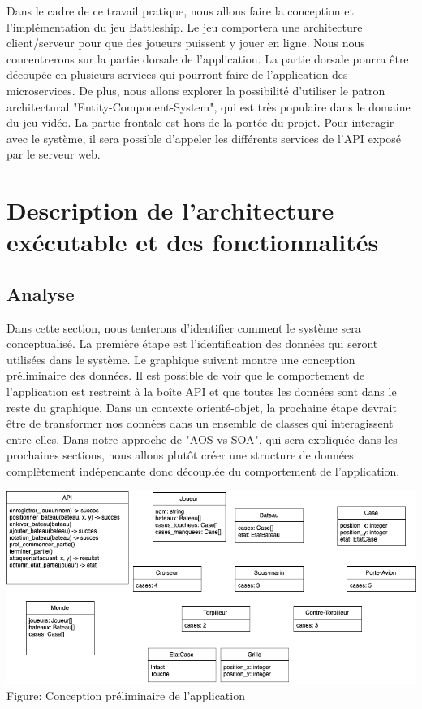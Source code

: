 \documentclass[12pt]{article}
\begin{document}
Dans le cadre de ce travail pratique, nous allons faire la conception et l'implémentation du jeu Battleship. Le jeu comportera une architecture client/serveur pour que des joueurs puissent y jouer en ligne. Nous nous concentrerons sur la partie dorsale de l'application. La partie dorsale pourra être découpée en plusieurs services qui pourront faire de l'application des microservices. De plus, nous allons explorer la possibilité d'utiliser le patron architectural "Entity-Component-System", qui est très populaire dans le domaine du jeu vidéo. La partie frontale est hors de la portée du projet. Pour interagir avec le système, il sera possible d'appeler les différents services de l'API exposé par le serveur web.

\section{Description de l’architecture exécutable et des fonctionnalités} 

\subsection{Analyse}
Dans cette section, nous tenterons d'identifier comment le système sera conceptualisé. La première étape est l'identification des données qui seront utilisées dans le système. Le graphique suivant montre une conception préliminaire des données. Il est possible de voir que le comportement de l'application est restreint à la boîte API et que toutes les données sont dans le reste du graphique. Dans un contexte orienté-objet, la prochaine étape devrait être de transformer nos données dans un ensemble de classes qui interagissent entre elles. Dans notre approche de "AOS vs SOA", qui sera expliquée dans les prochaines sections, nous allons plutôt créer une structure de données complètement indépendante donc découplée du comportement de l'application.

\begin{center}
\includegraphics[scale = 0.5]{analyse_tp1.png} \\
Figure: Conception préliminaire de l'application
\\[1.0 cm]
\end{center}
\end{document}
